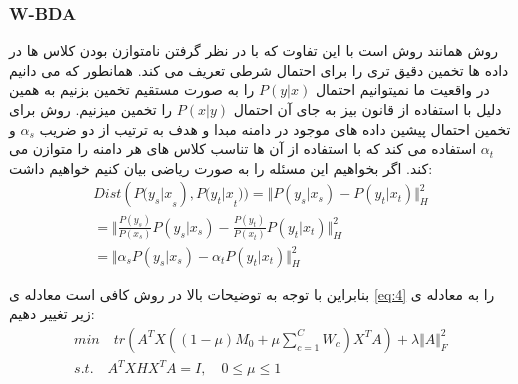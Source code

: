 {{ 	\subsubsection{W-BDA}
 	{
 		روش 
 		همانند روش 
 		است با این تفاوت که با در نظر گرفتن نامتوازن بودن کلاس ها در داده ها تخمین دقیق تری را برای احتمال شرطی تعریف می کند.  همانطور که می دانیم در واقعیت ما نمیتوانیم احتمال 
 		$P(y|x)$
 		را به صورت مستقیم تخمین بزنیم به همین دلیل با استفاده از قانون بیز به جای آن احتمال 
 		$P(x|y)$
 		را تخمین میزنیم. روش 
 		برای تخمین احتمال پیشین داده های موجود در دامنه مبدا و هدف به ترتیب از دو ضریب 
 		$\alpha_s$
 		و 
 		$\alpha_t$
 	  استفاده می کند که با استفاده از آن ها تناسب کلاس های هر دامنه را متوازن می کند. اگر بخواهیم این مسئله را به صورت ریاضی بیان کنیم خواهیم داشت:
 		\begin{equation}
 		\begin{aligned}
 		Dist({P(y_s|x}_s),{P(y_t|x}_t))= \Vert P \left( y_{s} \vert x_{s} \right)  -P \left( y_{t} \vert x_{t} \right) \Vert  _{H}^{2}\\
 		= \bigg \Vert \frac{P \left( y_{s} \right) }{P \left( x_{s} \right) }P \left( y_{s} \vert x_{s} \right)  -\frac{P \left( y_{t} \right) }{P \left( x_{t} \right) }P \left( y_{t} \vert x_{t} \right) \bigg \Vert  _{H}^{2}\quad \quad \quad \quad \quad\\
 		= \Vert \alpha _{s}P \left( y_{s} \vert x_{s} \right)  - \alpha _{t}P \left( y_{t} \vert x_{t} \right)  \Vert  _{H}^{2} \quad \quad \quad \quad \quad \quad \quad \quad \quad 
 		\end{aligned}
 		\label{eq:7}
 		\end{equation}
 		
 		بنابراین با توجه به توضیحات بالا در روش 
 		کافی است معادله ی 
 		\ref{eq:4}
 		را به معادله ی زیر تغییر دهیم:
 		\begin{equation}
 		\begin{aligned}
 		min \quad tr \left( A^{T}X \left( \left( 1 - \mu \right) M_{0} + \mu \sum _{c=1\mathrm{ }}^{C}W_{c} \right) X^{T}A \right) + \lambda \Vert A \Vert_{F}^{2} \\
 		s.t. \quad A^{T}XHX^{T}A = I, \quad  0  \leq \mu \leq  1 \quad \quad \quad \quad \quad
 		\label{eq:8}
 		\end{aligned}
 		\end{equation}
 		
}}}
